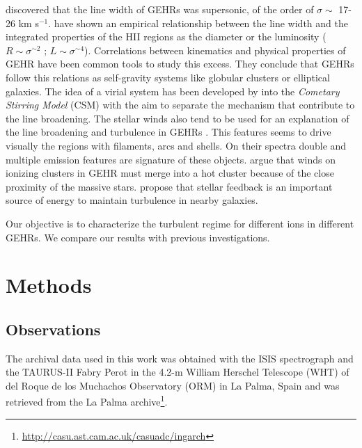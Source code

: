 \documentclass[fleqn,usenatbib]{mnras}
\newcommand\kms{$^{-1}$}
\begin{document}
\citet{smith1970} discovered that the line width of GEHRs was supersonic, of the order of $\sigma \sim$ 17-26 km s\kms. \citet{melnick1977,terlevich1981} have shown an empirical relationship between the line width and the integrated properties of the HII regions as the diameter or the luminosity ($R \sim \sigma ^{\sim 2}$ ; $L \sim \sigma ^{\sim 4}$). Correlations between kinematics and physical properties of GEHR have been common tools to study this excess. They conclude that GEHRs follow this relations as self-gravity systems like globular clusters or elliptical galaxies. The idea of a virial system has been developed by \citet{1993ApJ...418..767T,munoz1996} into the \textit{Cometary Stirring Model} (CSM) with the aim to separate the mechanism that contribute to the line broadening. The stellar winds also tend to be used for an explanation of the line broadening and turbulence in GEHRs \citep{1994ApJ...425..720C}. This features seems to drive visually the regions with filaments, arcs and shells. On their spectra double and multiple emission features are signature of these objects. \cite{2020MNRAS.494...97S} argue that winds on ionizing clusters in GEHR must merge into a hot cluster because of the close proximity of the massive stars. \cite{2019ApJ...871...17U} propose that stellar feedback is an important source of energy to maintain turbulence in nearby galaxies.

Our objective is to characterize the turbulent regime for different ions in different GEHRs. We compare our results with previous investigations.


\section{Methods}\label{sec:met}

\subsection{Observations}\label{sec:obs}

The archival data used in this work was obtained with the ISIS spectrograph and the TAURUS-II Fabry Perot in the 4.2-m William Herschel Telescope (WHT) of del Roque de los Muchachos Observatory (ORM) in La Palma, Spain and was retrieved from the La Palma archive\footnote{\url{http://casu.ast.cam.ac.uk/casuadc/ingarch}}.
\end{document}

